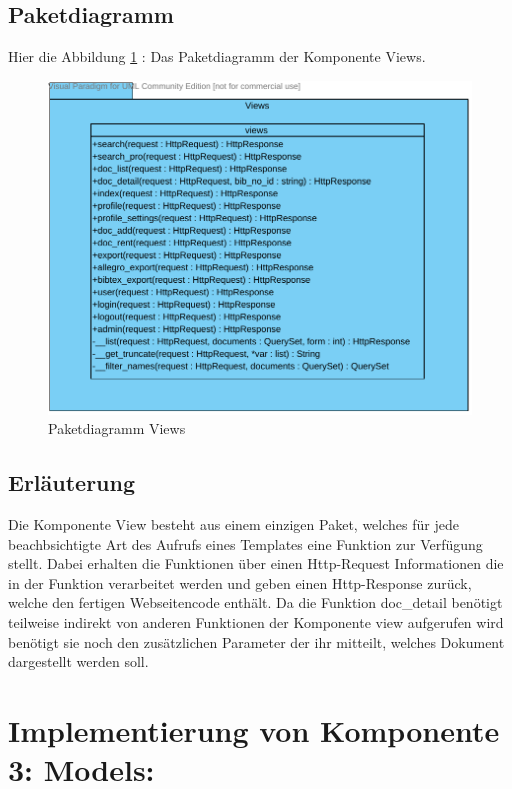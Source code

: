 \subsection{Paketdiagramm}
Hier die Abbildung \ref{fig:PDviews} : Das Paketdiagramm der Komponente Views.
\begin{figure}[!htb]
\includegraphics[width=0.8\linewidth]{bilder/Paketdiagramm_views.pdf}
\caption{Paketdiagramm Views}
\label{fig:PDviews}
\end{figure}
\subsection{Erl\"auterung}
Die Komponente View besteht aus einem einzigen Paket, welches für jede
beachbsichtigte Art des Aufrufs eines Templates eine Funktion zur Verfügung
stellt. Dabei erhalten die Funktionen über einen Http-Request Informationen die
in der Funktion verarbeitet werden und geben einen Http-Response zurück, welche
den fertigen Webseitencode enthält. Da die Funktion doc\_detail benötigt
teilweise indirekt von anderen Funktionen der Komponente view aufgerufen wird
benötigt sie noch den zusätzlichen Parameter der ihr mitteilt, welches Dokument
dargestellt werden soll.


\section{Implementierung von Komponente
         3: Models:}


